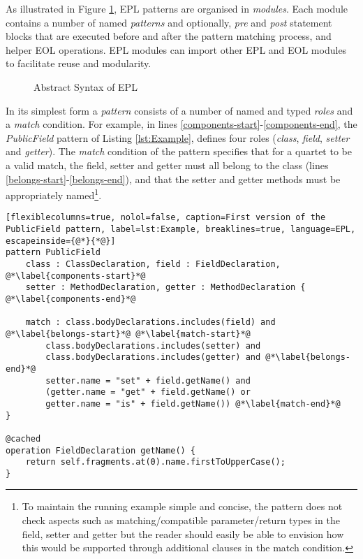 As illustrated in Figure \ref{fig:EPLAbstractSyntax}, EPL patterns are organised in \emph{modules}. Each module contains a number of named \emph{patterns} and optionally, \emph{pre} and \emph{post} statement blocks that are executed before and after the pattern matching process, and helper EOL operations. EPL modules can import other EPL and EOL modules to facilitate reuse and modularity.

\begin{figure}[htbp]
\centering
{}
\caption{Abstract Syntax of EPL}
\label{fig:EPLAbstractSyntax}
\end{figure}

In its simplest form a \emph{pattern} consists of a number of named and typed \emph{roles} and a \emph{match} condition. For example, in lines \ref{components-start}-\ref{components-end}, the \emph{PublicField} pattern of Listing \ref{lst:Example}, defines four roles (\emph{class}, \emph{field}, \emph{setter} and \emph{getter}). The \emph{match} condition of the pattern specifies that for a quartet to be a valid match, the field, setter and getter must all belong to the class (lines \ref{belongs-start}-\ref{belongs-end}), and that the setter and getter methods must be appropriately named\footnote{To maintain the running example simple and concise, the pattern does not check aspects such as matching/compatible parameter/return types in the field, setter and getter but the reader should easily be able to envision how this would be supported through additional clauses in the match condition.}.
\clearpage
\begin{lstlisting}[flexiblecolumns=true, nolol=false, caption=First version of the PublicField pattern, label=lst:Example, breaklines=true, language=EPL, escapeinside={@*}{*@}]
pattern PublicField
	class : ClassDeclaration, field : FieldDeclaration, @*\label{components-start}*@
	setter : MethodDeclaration, getter : MethodDeclaration { @*\label{components-end}*@
	
	match : class.bodyDeclarations.includes(field) and @*\label{belongs-start}*@ @*\label{match-start}*@
		class.bodyDeclarations.includes(setter) and
		class.bodyDeclarations.includes(getter) and @*\label{belongs-end}*@
		setter.name = "set" + field.getName() and
		(getter.name = "get" + field.getName() or
		getter.name = "is" + field.getName()) @*\label{match-end}*@
}

@cached
operation FieldDeclaration getName() {
	return self.fragments.at(0).name.firstToUpperCase();
}
\end{lstlisting}

